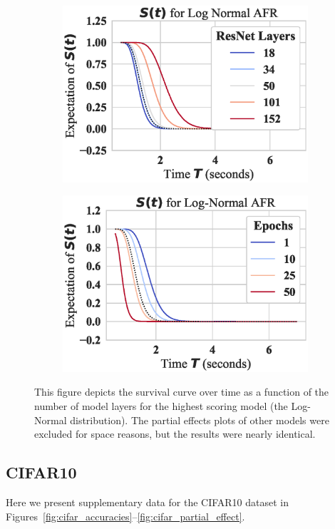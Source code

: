 \begin{figure}[!h]
    \begin{subfigure}
        \centering\includegraphics[width=.45\textwidth]{cifar/log_normal_layers_partial_effect.eps}
    \end{subfigure}
    \begin{subfigure}
        \centering\includegraphics[width=.45\textwidth]{cifar/log_normal_epochs_partial_effect.eps}
    \end{subfigure}
    \caption{This figure depicts the survival curve over time as a function of the number of model layers for the highest scoring model (the Log-Normal distribution). The partial effects plots of other models were excluded for space reasons, but the results were nearly identical.}
    \label{fig:mnist_partial_effect}
\end{figure}





\newpage
\subsection{CIFAR10}
Here we present supplementary data for the CIFAR10 dataset in Figures~\ref{fig:cifar_accuracies}--\ref{fig:cifar_partial_effect}.


